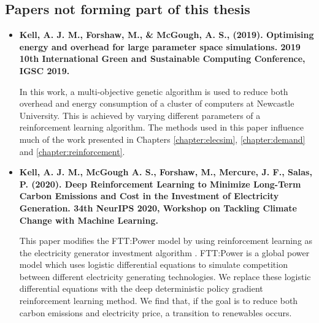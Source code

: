 \subsection*{Papers not forming part of this thesis}

\begin{itemize}
	\item[\textbf{\cite{Kell2019}}] \textbf{Kell, A. J. M., Forshaw, M., \& McGough, A. S., (2019). Optimising energy and overhead for large parameter space simulations. 2019 10th International Green and Sustainable Computing Conference, IGSC 2019. }
	
	In this work, a multi-objective genetic algorithm is used to reduce both overhead and energy consumption of a cluster of computers at Newcastle University. This is achieved by varying different parameters of a reinforcement learning algorithm. The methods used in this paper influence much of the work presented in Chapters \ref{chapter:elecsim}, \ref{chapter:demand} and \ref{chapter:reinforcement}.
	
	\item[\textbf{\cite{KellA.J.M.McGoughA.S.ForshawM.MercureJ.F.Salas2020}}] \textbf{Kell, A. J. M., McGough A. S., Forshaw, M., Mercure, J. F., Salas, P. (2020). Deep Reinforcement Learning to Minimize Long-Term Carbon Emissions and Cost in the Investment of Electricity Generation. 34th NeurIPS 2020, Workshop on Tackling Climate Change with Machine Learning.}
	
	This paper modifies the FTT:Power model by using reinforcement learning as the electricity generator investment algorithm \cite{Mercure2012}. FTT:Power is a global power model which uses logistic differential equations to simulate competition between different electricity generating technologies. We replace these logistic differential equations with the deep deterministic policy gradient reinforcement learning method. We find that, if the goal is to reduce both carbon emissions and electricity price, a transition to renewables occurs.
\end{itemize}

